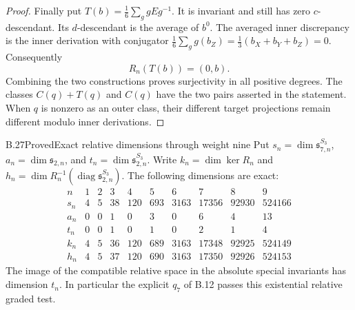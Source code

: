 \begin{proof}
Finally put $T(b)=\frac16\sum_g gEg^{-1}$. It is invariant and
still has zero $c$-descendant. Its $d$-descendant is the average of
$b^0$. The averaged inner discrepancy is the inner derivation with
conjugator
$\frac16\sum_g g(b_Z)=\frac13(b_X+b_Y+b_Z)=0$.
Consequently
\[
                 R_n(T(b))=(0,b).
\]
Combining the two constructions proves surjectivity in all positive
degrees. The classes $C(q)+T(q)$ and $C(q)$ have the two pairs asserted
in the statement. When $q$ is nonzero as an outer class, their
different target projections remain different modulo inner derivations.
\end{proof}

\begin{statement}{B.27}{Proved}{Exact relative dimensions through weight nine}
Put $s_n=\dim\mathfrak s_{7,n}^{S_3}$,
$a_n=\dim\mathfrak s_{2,n}$, and
$t_n=\dim\mathfrak s_{2,n}^{S_3}$. Write $k_n=\dim\ker R_n$ and
$h_n=\dim R_n^{-1}(\operatorname{diag}\mathfrak s_{2,n}^{S_3})$.
The following dimensions are exact:
\[
\begin{array}{c|rrrrrrrrr}
 n&1&2&3&4&5&6&7&8&9\\ \hline
 s_n&4&5&38&120&693&3163&17356&92930&524166\\
 a_n&0&0&1&0&3&0&6&4&13\\
 t_n&0&0&1&0&1&0&2&1&4\\
 k_n&4&5&36&120&689&3163&17348&92925&524149\\
 h_n&4&5&37&120&690&3163&17350&92926&524153
\end{array}
\]
The image of the compatible relative space in the absolute special
invariants has dimension $t_n$. In particular the explicit $q_7$ of
B.12 passes this existential relative graded test.
\end{statement}
